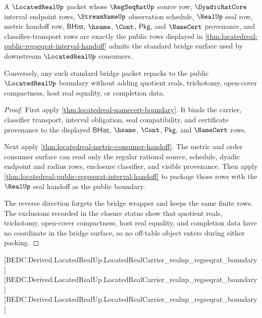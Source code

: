 \begin{theorem}
\label{thm:locatedreal-standard-bridge-boundary}
A $\LocatedRealUp$ packet whose $\RegSeqRatUp$ source row, $\DyadicRatCore$ interval endpoint rows, $\StreamNameUp$ observation schedule, $\RealUp$ seal row, metric handoff row, $\mathsf{BHist}$, $\hsame$, $\Cont$, $\mathsf{Pkg}$, and $\NameCert$ provenance, and classifier-transport rows are exactly the public rows displayed in \autoref{thm:locatedreal-public-regseqrat-interval-handoff} admits the standard bridge surface used by downstream $\LocatedRealUp$ consumers.

Conversely, any such standard bridge packet repacks to the public $\LocatedRealUp$ boundary without adding quotient reals, trichotomy, open-cover compactness, host real equality, or completion data.
\end{theorem}
\begin{proof}
First apply \autoref{thm:locatedreal-namecert-boundary}. It binds the carrier, classifier transport, interval obligation, seal compatibility, and certificate provenance to the displayed $\mathsf{BHist}$, $\hsame$, $\Cont$, $\mathsf{Pkg}$, and $\NameCert$ rows.

Next apply \autoref{thm:locatedreal-metric-consumer-handoff}. The metric and order consumer surface can read only the regular rational source, schedule, dyadic endpoint and radius rows, enclosure classifier, and visible provenance. Then apply \autoref{thm:locatedreal-public-regseqrat-interval-handoff} to package those rows with the $\RealUp$ seal handoff as the public boundary.

The reverse direction forgets the bridge wrapper and keeps the same finite rows. The exclusions recorded in the closure status show that quotient reals, trichotomy, open-cover compactness, host real equality, and completion data have no coordinate in the bridge surface, so no off-table object enters during either packing.
\end{proof}

[BEDC.Derived.LocatedRealUp.LocatedRealCarrier\_realup\_regseqrat\_boundary]
[BEDC.Derived.LocatedRealUp.LocatedRealCarrier\_realup\_regseqrat\_boundary]
[BEDC.Derived.LocatedRealUp.LocatedRealCarrier\_realup\_regseqrat\_boundary]

